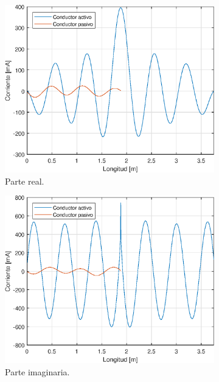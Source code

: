 \begin{figure}[H]
	\begin{subfigure}{0.5\textwidth}
		\includegraphics[scale=0.6]{imagenes/i_real_480.eps}
		\caption{Parte real.}
	\end{subfigure}
	\quad
	\begin{subfigure}{0.5\textwidth}
		\includegraphics[scale=0.6]{imagenes/i_imag_480.eps}
		\caption{Parte imaginaria.}
	\end{subfigure}
	\quad
	\begin{subfigure}{0.5\textwidth}

\end{subfigure}
\end{figure}
